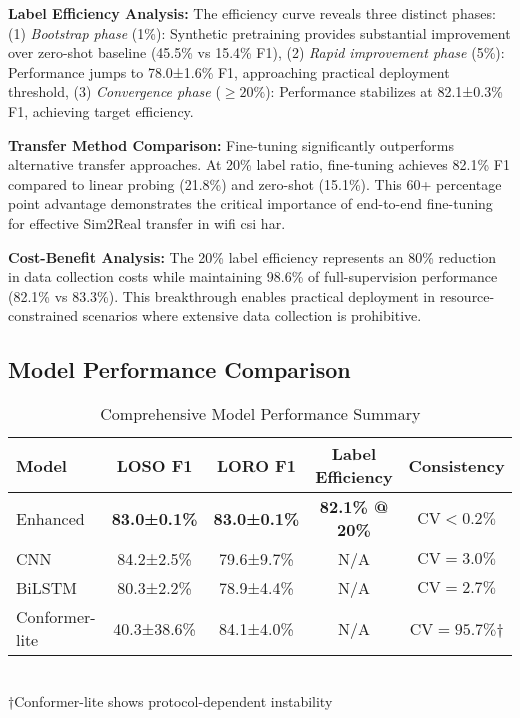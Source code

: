 \documentclass[journal]{IEEEtran}
\begin{document}
\textbf{Label Efficiency Analysis:} The efficiency curve reveals three distinct phases: (1) \textit{Bootstrap phase} (1\%): Synthetic pretraining provides substantial improvement over zero-shot baseline (45.5\% vs 15.4\% F1), (2) \textit{Rapid improvement phase} (5\%): Performance jumps to 78.0±1.6\% F1, approaching practical deployment threshold, (3) \textit{Convergence phase} ($\geq 20\%$): Performance stabilizes at 82.1±0.3\% F1, achieving target efficiency.

\textbf{Transfer Method Comparison:} Fine-tuning significantly outperforms alternative transfer approaches. At 20\% label ratio, fine-tuning achieves 82.1\% F1 compared to linear probing (21.8\%) and zero-shot (15.1\%). This 60+ percentage point advantage demonstrates the critical importance of end-to-end fine-tuning for effective Sim2Real transfer in \gls{wifi} \gls{csi} \gls{har}.

\textbf{Cost-Benefit Analysis:} The 20\% label efficiency represents an 80\% reduction in data collection costs while maintaining 98.6\% of full-supervision performance (82.1\% vs 83.3\%). This breakthrough enables practical deployment in resource-constrained scenarios where extensive data collection is prohibitive.

\subsection{Model Performance Comparison}

\begin{table}[ht]
\centering
\caption{Comprehensive Model Performance Summary}
\begin{tabular}{@{}lcccc@{}}
\toprule
Model & LOSO F1 & LORO F1 & Label Efficiency & Consistency \\
\midrule
Enhanced & \textbf{83.0±0.1\%} & \textbf{83.0±0.1\%} & \textbf{82.1\% @ 20\%} & \textbf{$\text{CV}<0.2\%$} \\
CNN & 84.2±2.5\% & 79.6±9.7\% & N/A & $\text{CV}=3.0\%$ \\
BiLSTM & 80.3±2.2\% & 78.9±4.4\% & N/A & $\text{CV}=2.7\%$ \\
Conformer-lite & 40.3±38.6\% & 84.1±4.0\% & N/A & $\text{CV}=95.7\%$† \\
\bottomrule
\end{tabular}\\
\footnotesize{†Conformer-lite shows protocol-dependent instability}
\label{tab:model_performance}
\end{table}
\end{document}
